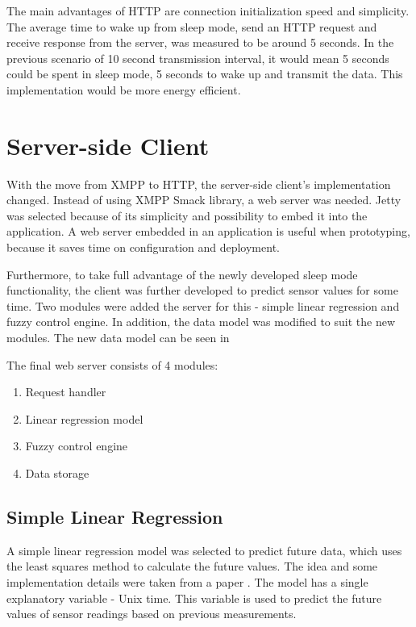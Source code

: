 The main advantages of HTTP are connection initialization speed and simplicity. The average time to wake up from sleep mode, send an HTTP request and receive response from the server, was measured to be around 5 seconds. In the previous scenario of 10 second transmission interval, it would mean 5 seconds could be spent in sleep mode, 5 seconds to wake up and transmit the data. This implementation would be more energy efficient. 


\section{Server-side Client}

With the move from XMPP to HTTP, the server-side client's implementation changed. Instead of using XMPP Smack library, a web server was needed. Jetty was selected because of its simplicity and possibility to embed it into the application. A web server embedded in an application is useful when prototyping, because it saves time on configuration and deployment. 

Furthermore, to take full advantage of the newly developed sleep mode functionality, the client was further developed to predict sensor values for some time. Two modules were added the server for this - simple linear regression and fuzzy control engine. In addition, the data model was modified to suit the new modules. The new data model can be seen in 

The final web server consists of 4 modules:
\begin{enumerate}
\item Request handler
\item Linear regression model
\item Fuzzy control engine
\item Data storage
\end{enumerate}

\subsection{Simple Linear Regression}

A simple linear regression model was selected to predict future data, which uses the least squares method to calculate the future values. The idea and some implementation details were taken from a paper . The model has a single explanatory variable - Unix time. This variable is used to predict the future values of sensor readings based on previous measurements. 

